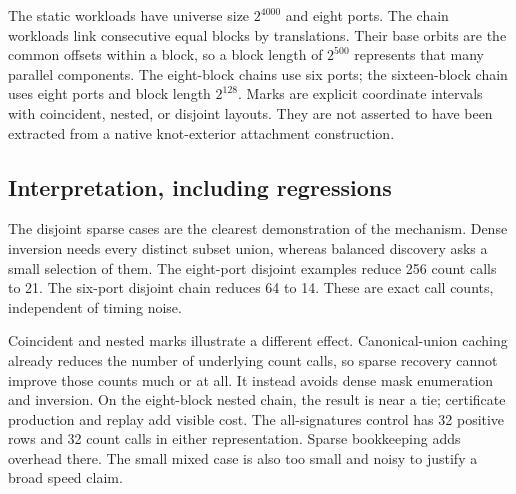 \documentclass[11pt,letterpaper]{article}
\begin{document}
\begin{table}[htbp]
\centering\small

\caption{Completed same-kernel component measurements. Times are milliseconds.
``Ratio'' is paired dense time divided by balanced sparse time; values below
one indicate a slowdown. No row is a whole-knot recognition benchmark.}
\label{tab:timings}
\end{table}

The static workloads have universe size $2^{4000}$ and eight ports. The chain
workloads link consecutive equal blocks by translations. Their base orbits are
the common offsets within a block, so a block length of $2^{500}$ represents
that many parallel components. The eight-block chains use six ports; the
sixteen-block chain uses eight ports and block length $2^{128}$. Marks are
explicit coordinate intervals with coincident, nested, or disjoint layouts.
They are not asserted to have been extracted from a native knot-exterior
attachment construction.

\begin{table}[htbp]
\centering\small

\caption{Actual orbit calls, including the baseline. Here $s_0$ includes a
positive empty signature. Proof size is the JSON byte count divided by 1024;
it is a transport measurement, not a claim of minimal binary encoding.}
\label{tab:queries}
\end{table}

\subsection{Interpretation, including regressions}
The disjoint sparse cases are the clearest demonstration of the mechanism.
Dense inversion needs every distinct subset union, whereas balanced discovery
asks a small selection of them. The eight-port disjoint examples reduce 256
count calls to 21. The six-port disjoint chain reduces 64 to 14. These are exact
call counts, independent of timing noise.

Coincident and nested marks illustrate a different effect. Canonical-union
caching already reduces the number of underlying count calls, so sparse
recovery cannot improve those counts much or at all. It instead avoids dense
mask enumeration and inversion. On the eight-block nested chain, the result
is near a tie; certificate production and replay add visible cost. The
all-signatures control has 32 positive rows and 32 count calls in either
representation. Sparse bookkeeping adds overhead there. The small mixed
case is also too small and noisy to justify a broad speed claim.
\end{document}
